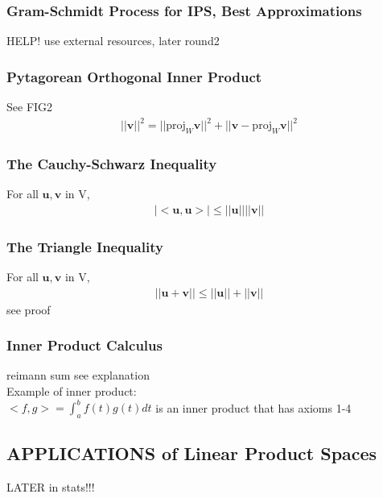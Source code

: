 \documentclass[12pt]{article}
\begin{document}
    \subsubsection{Gram-Schmidt Process for IPS, Best Approximations}
        HELP! use external resources, later round2
    \subsubsection{Pytagorean Orthogonal Inner Product}
        See FIG2 
        \begin{align*}
            ||\bm{v}||^2 = ||\text{proj}_W \bm{v}||^2 + 
            ||\bm{v}-\text{proj}_W \bm{v}||^2
        \end{align*}
    \subsubsection{The Cauchy-Schwarz Inequality}
        For all $\bm{u}, \bm{v}$  in V,
        \begin{align*}
            | \big<\bm{u}, \bm{u}\big> | \le 
            ||\bm{u}|| ||\bm{v}||
        \end{align*}
    \subsubsection{The Triangle Inequality}
        For all $\bm{u}, \bm{v}$  in V,
        \begin{align*}
            ||\bm{u}+ \bm{v}|| \le ||\bm{u}|| + ||\bm{v}||
        \end{align*}
        see proof
    \subsubsection{Inner Product Calculus}
        reimann sum see explanation \\
        Example of inner product:\\
        $ \big<f, g\big> = \int_{a}^{b}f(t)g(t)dt$ 
        is an inner product that has axioms 1-4
\subsection{APPLICATIONS of Linear Product Spaces}
    LATER in stats!!!
        
        
\end{document}
